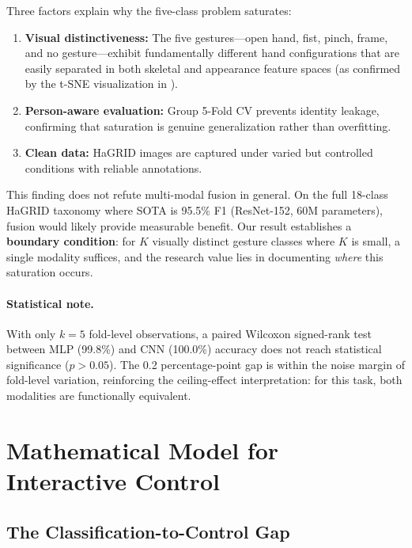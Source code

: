 \documentclass[11pt,a4paper]{article}
\begin{document}
Three factors explain why the five-class problem saturates:
\begin{enumerate}
    \item \textbf{Visual distinctiveness:} The five gestures---open hand, fist, pinch, frame, and no gesture---exhibit fundamentally different hand configurations that are easily separated in both skeletal and appearance feature spaces (as confirmed by the t-SNE visualization in ).
    \item \textbf{Person-aware evaluation:} Group 5-Fold CV prevents identity leakage, confirming that saturation is genuine generalization rather than overfitting.
    \item \textbf{Clean data:} HaGRID images are captured under varied but controlled conditions with reliable annotations.
\end{enumerate}

This finding does not refute multi-modal fusion in general. On the full 18-class HaGRID taxonomy where SOTA is 95.5\% F1 (ResNet-152, 60M parameters), fusion would likely provide measurable benefit. Our result establishes a \textbf{boundary condition}: for $K$ visually distinct gesture classes where $K$ is small, a single modality suffices, and the research value lies in documenting \emph{where} this saturation occurs.

\paragraph{Statistical note.} With only $k = 5$ fold-level observations, a paired Wilcoxon signed-rank test between MLP (99.8\%) and CNN (100.0\%) accuracy does not reach statistical significance ($p > 0.05$). The 0.2 percentage-point gap is within the noise margin of fold-level variation, reinforcing the ceiling-effect interpretation: for this task, both modalities are functionally equivalent.


\section{Mathematical Model for Interactive Control}
\label{sec:mathmodel}

\subsection{The Classification-to-Control Gap}
\end{document}
